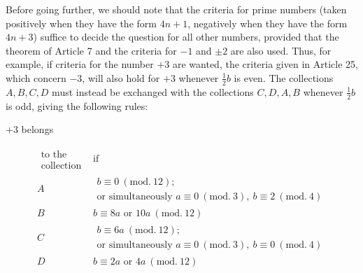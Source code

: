 Before going further, we should note that the criteria for prime numbers (taken positively when they have the form $4n+1$, negatively when they have the form $4n+3$) suffice to decide the question for all other numbers, provided that the theorem of Article 7 and the criteria for $-1$ and $\pm2$ are also used. Thus, for example, if criteria for the number $+3$ are wanted, the criteria given in Article 25, which concern $-3$, will also hold for $+3$ whenever $\frac12b$ is even. The collections $A,B,C,D$ must instead be exchanged with the collections $C,D,A,B$ whenever $\frac12b$ is odd, giving the following rules:


%
\begin{center}$+3$ belongs\end{center}
{\small
\[
\begin{array}{c|l}
\substack{\text{to the}\\\text{collection}}&\text{if}\\
A&\begin{aligned}b\equiv0\ (\mathrm{mod.}\ 12);\\\text{or simultaneously }a\equiv0\ (\mathrm{mod.}\ 3),\ b\equiv2\ (\mathrm{mod.}\ 4)\end{aligned}\\
B&b\equiv8a\text{ or }10a\ (\mathrm{mod.}\ 12)\\
C&\begin{aligned}b\equiv6a\ (\mathrm{mod.}\ 12);\\\text{or simultaneously }a\equiv0\ (\mathrm{mod.}\ 3),\ b\equiv0\ (\mathrm{mod.}\ 4)\end{aligned}\\
D&b\equiv2a\text{ or }4a\ (\mathrm{mod.}\ 12)
\end{array}
\]
}

